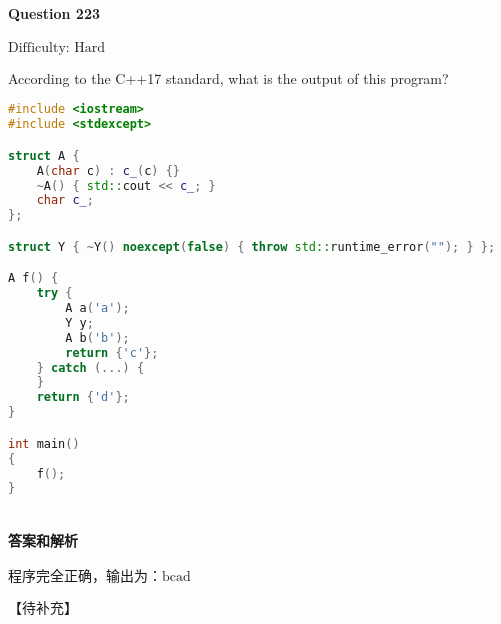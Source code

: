 \documentclass{article}
\begin{document}
	\paragraph*{Question 223} $\boxed{\text{Difficulty: Hard}} $			
	
	According to the C++17 standard, what is the output of this program?
	
	\begin{lstlisting}[language=C++]  		
#include <iostream>
#include <stdexcept>

struct A {
	A(char c) : c_(c) {}
	~A() { std::cout << c_; }
	char c_;
};

struct Y { ~Y() noexcept(false) { throw std::runtime_error(""); } };

A f() {
	try {
		A a('a');
		Y y;
		A b('b');
		return {'c'};
	} catch (...) {
	}
	return {'d'};
}

int main()
{
	f();
}
		
	\end{lstlisting}
	
	\paragraph*{答案和解析} $\boxed{\text{程序完全正确，输出为：bcad}} $
	
	【待补充】
\end{document}
